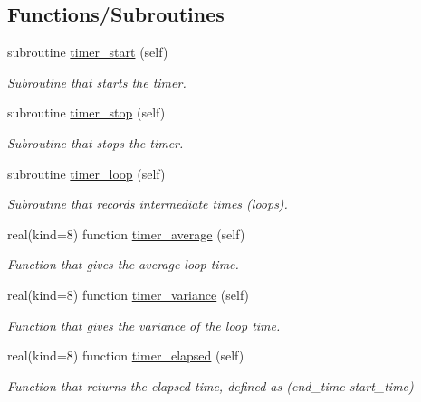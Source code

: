 \subsection*{Functions/\+Subroutines}
\begin{DoxyCompactItemize}
\item 
subroutine \hyperlink{namespacef2k__timer_a70057597d71664f70b9164c7d741c839}{timer\+\_\+start} (self)
\begin{DoxyCompactList}\small\item\em Subroutine that starts the timer. \end{DoxyCompactList}\item 
subroutine \hyperlink{namespacef2k__timer_a9dcd2c81036ce32527bd3460606694b4}{timer\+\_\+stop} (self)
\begin{DoxyCompactList}\small\item\em Subroutine that stops the timer. \end{DoxyCompactList}\item 
subroutine \hyperlink{namespacef2k__timer_a605274108f4afabff1821ec1a1243575}{timer\+\_\+loop} (self)
\begin{DoxyCompactList}\small\item\em Subroutine that records intermediate times (loops). \end{DoxyCompactList}\item 
real(kind=8) function \hyperlink{namespacef2k__timer_a02dfc06ae09be917c91560357d92ab3f}{timer\+\_\+average} (self)
\begin{DoxyCompactList}\small\item\em Function that gives the average loop time. \end{DoxyCompactList}\item 
real(kind=8) function \hyperlink{namespacef2k__timer_a2794f7fb1f1084d23939c19d812642ad}{timer\+\_\+variance} (self)
\begin{DoxyCompactList}\small\item\em Function that gives the variance of the loop time. \end{DoxyCompactList}\item 
real(kind=8) function \hyperlink{namespacef2k__timer_a2be6741422c75d3280019867de272e19}{timer\+\_\+elapsed} (self)
\begin{DoxyCompactList}\small\item\em Function that returns the elapsed time, defined as (end\+\_\+time-\/start\+\_\+time) \end{DoxyCompactList}\item 

\end{DoxyCompactItemize}
